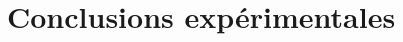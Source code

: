 \documentclass[french, a4paper, 11pt, twoside, pdftex]{StyleThese}
\begin{document}
               
    \section{Conclusions expérimentales}  
\ifdefined{}
\else


\end{document}
